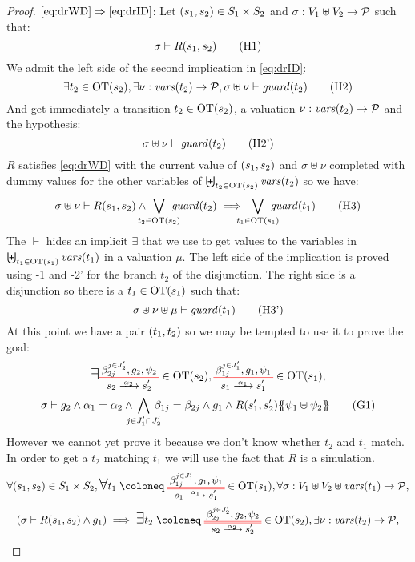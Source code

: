 \documentclass{article}
\begin{document}
\begin{proof}
\item[\(\eqref{eq:drWD}\Rightarrow\eqref{eq:drID}\):]
	Let \({\left(s_1, s_2\right)} \in S_1 \times S_2\) and \(\sigma: V_1 \uplus V_2 \to \mathcal{P}\) such that:
	\[ \sigma \vdash R\mpar{s_1, s_2} \hyp{1} \]
	We admit the left side of the second implication in \eqref{eq:drID}:
	\[ \exists t_2 \in \fOT{s_2}, \exists \nu: \fvars{t_2} \to \values, \sigma \uplus \nu \vdash \fguard{t_2} \hyp{2} \]
	And get immediately a transition \(t_2 \in \mathrm{OT}{\left(s_2\right)}\), a valuation \(\nu: \mathit{vars}{\left(t_2\right)} \to \mathcal{P}\) and the hypothesis:
	\[ \sigma \uplus \nu \vdash \fguard{t_2} \hyp{2'} \]
	\(R\) satisfies \eqref{eq:drWD} with the current value of \({\left(s_1, s_2\right)}\) and \(\sigma \uplus \nu\) completed with dummy values for the other variables of \(\biguplus_{t_2 \in \mathrm{OT}{\left(s_2\right)}} \mathit{vars}{\left(t_2\right)}\) so we have:
	\[ \sigma \uplus \nu \vdash R\mpar{s_1, s_2} \wedge \bigvee_\subbox{t_2 \in \fOT{s_2}} \fguard{t_2} \implies \bigvee_\subbox{t_1 \in \fOT{s_1}} \fguard{t_1} \hyp{3} \]
	The \(\vdash\) hides an implicit \(\exists\) that we use to get values to the variables in \(\biguplus_{t_1 \in \mathrm{OT}{\left(s_1\right)}} \mathit{vars}{\left(t_1\right)}\) in a valuation \(\mu\).
	The left side of the implication is proved using \hyp{1} and \hyp{2'} for the branch \(t_2\) of the disjunction.
	The right side is a disjunction so there is a \(t_1 \in \mathrm{OT}{\left(s_1\right)}\) such that:
	\[ \sigma \uplus \nu \uplus \mu \vdash \fguard{t_1} \hyp{3'} \]
	At this point we have a pair \({\left(t_1, t_2\right)}\) so we may be tempted to use it to prove the goal:
	\begin{multline}
		\bigsymb{\exists} \OTx{2}{}{2}{2} \in \fOT{s_2}, \OTx{1}{}{1}{1} \in \fOT{s_1}, \\
		\sigma \vdash g_2 \wedge \alpha_1 = \alpha_2 \wedge \bigwedge_\subbox{j \in J'_1 \cap J'_2} \beta_{1j} = \beta_{2j} \wedge g_1 \wedge R\mpar{s'_1, s'_2}\psubst{\psi_1 \uplus \psi_2} \goal{1}
	\end{multline}
	However we cannot yet prove it because we don't know whether \(t_2\) and \(t_1\) match.
	In order to get a \(t_2\) matching \(t_1\) we will use the fact that \(R\) is a simulation.
	\begin{multline}
		\forall \mpar{s_1, s_2} \in S_1 \times S_2, \bigsymb{\forall} t_1 \defobject \OTx{1}{}{1}{1} \in \fOT{s_1}, \forall \sigma: V_1 \uplus V_2 \uplus \fvars{t_1} \to \values, \\
		\mpar{\sigma \vdash R\mpar{s_1, s_2} \wedge g_1} \implies \bigsymb{\exists} t_2 \defobject \OTx{2}{}{2}{2} \in \fOT{s_2}, \exists \nu: \fvars{t_2} \to \values, \\

\end{multline}
\end{proof}
\end{document}
